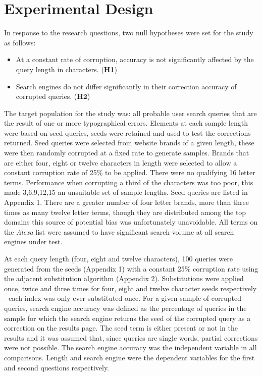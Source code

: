 \documentclass{csfourzero}
\begin{document}
\section{Experimental Design}
\label{sec:exp}

In response to the research questions, two null hypotheses were set for the study as follows:
\begin{itemize}
  \item{At a constant rate of corruption, accuracy is not significantly affected by the query length in characters. (\textbf{H1})}
  \item{Search engines do not differ significantly in their correction accuracy of corrupted queries. (\textbf{H2})}
\end{itemize}

\noindent
The target population for the study was: all probable user search queries that are the result of one or more typographical errors. Elements at each sample length were based on seed queries, seeds were retained and used to test the corrections returned. Seed queries were selected from website brands of a given length, these were then randomly corrupted at a fixed rate to generate samples. Brands that are either four, eight or twelve characters in length were selected to allow a constant corruption rate of 25\% to be applied. There were no qualifying 16 letter terms. Performance when corrupting a third of the characters was too poor, this made 3,6,9,12,15 an unsuitable set of sample lengths. Seed queries are listed in Appendix 1. There are a greater number of four letter brands, more than three times as many twelve letter terms, though they are distributed among the top domains this source of potential bias was unfortunately unavoidable. All terms on the \textit{Alexa} list were assumed to have significant search volume at all search engines under test.

At each query length (four, eight and twelve characters), 100 queries were generated from the seeds (Appendix 1) with a constant 25\% corruption rate using the adjacent substitution algorithm (Appendix 2). Substitutions were applied once, twice and three times for four, eight and twelve character seeds respectively - each index was only ever substituted once. For a given sample of corrupted queries, search engine accuracy was defined as the percentage of queries in the sample for which the search engine returns the seed of the corrupted query as a correction on the results page. The seed term is either present or not in the results and it was assumed that, since queries are single words, partial corrections were not possible. The search engine accuracy was the independent variable in all comparisons. Length and search engine were the dependent variables for the first and second questions respectively.
\end{document}
